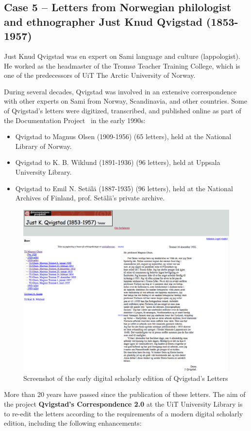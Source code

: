 \documentclass[runningheads]{llncs}
\begin{document}
\subsection{Case 5 -- Letters from Norwegian philologist and ethnographer Just Knud Qvigstad (1853-1957)}
Just Knud Qvigstad was en expert on Sami language and culture
(lappologist). He worked as the headmaster of the Tromsø Teacher
Training College, which is one of the predecessors of UiT The Arctic
University of Norway.

During several decades, Qvigstad was involved in an extensive
correspondence with other experts on Sami from Norway, Scandinavia, and
other countries. Some of Qvigstad's letters were digitized, transcribed,
and published online as part of the Documentation
Project~\cite{ref_dokpro} in the early 1990s:
\begin{itemize}
\tightlist
\item
  Qvigstad to Magnus Olsen (1909-1956) (65 letters), held at the
  National Library of Norway.
\item
  Qvigstad to K. B. Wiklund (1891-1936) (96 letters), held at Uppsala
  University Library.
\item
  Qvigstad to Emil N. Setälä (1887-1935) (96 letters), held at the
  National Archives of Finland, prof. Setälä's private archive.
\end{itemize}

\begin{figure}[h!]
\centering
\includegraphics[width=\textwidth]{qvigstad_dokprosjekt_snapshot.png}
\caption{Screenshot of the early digital scholarly edition of Qvigstad's Letters} \label{fig8}
\end{figure}
More than 20 years have passed since the publication of these letters.
The aim of the project \textbf{Qvigstad's Correspondence 2.0} at the UiT
University Library is to re-edit the letters according to the
requirements of a modern digital scholarly edition, including the
following enhancements:
\end{document}
